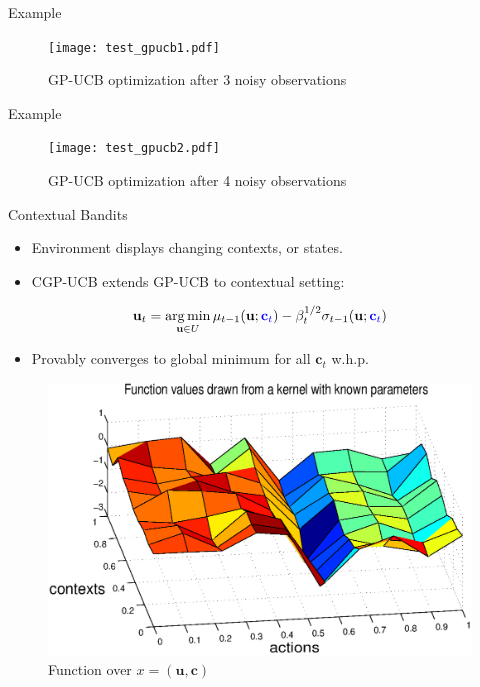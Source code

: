 \documentclass[handout]{beamer}
\newcommand{\sysInput}{\mathbf{u}} %
\newcommand{\context}{\mathbf{c}} %
\begin{document}
%
\begin{frame}{Example}
\begin{figure}
\center
\texttt{[image: test\_gpucb1.pdf]}			
\caption{GP-UCB optimization after 3 noisy observations}
\label{fig:gpucb1}
\end{figure}
\end{frame}
%
\begin{frame}{Example}
\begin{figure}
\center
\texttt{[image: test\_gpucb2.pdf]}			
\caption{GP-UCB optimization after 4 noisy observations}
\label{fig:gpucb2}
\end{figure}
\end{frame}
%
\begin{frame}{Contextual Bandits}
\begin{itemize}
\item Environment displays changing contexts, or states. \pause
\item CGP-UCB extends GP-UCB to contextual setting: \pause
\end{itemize}
\begin{equation}
\sysInput_{t} = \operatorname*{arg\,min}_{\sysInput \in U}\mu_{t-1}(\sysInput;\textcolor{blue}{\context_t}) - \beta_{t}^{1/2}\sigma_{t-1}(\sysInput;\textcolor{blue}{\context_t})
\end{equation}
\pause
\begin{itemize}
\item Provably converges \cite{Krause2} to global minimum for all $\context_t$ w.h.p. 
\end{itemize}
\begin{figure}
\center
\includegraphics[scale=0.30]{test_fnc.eps}			
\caption{Function over $x = (\sysInput, \context)$}
\end{figure}
\end{frame}
%
\end{document}

